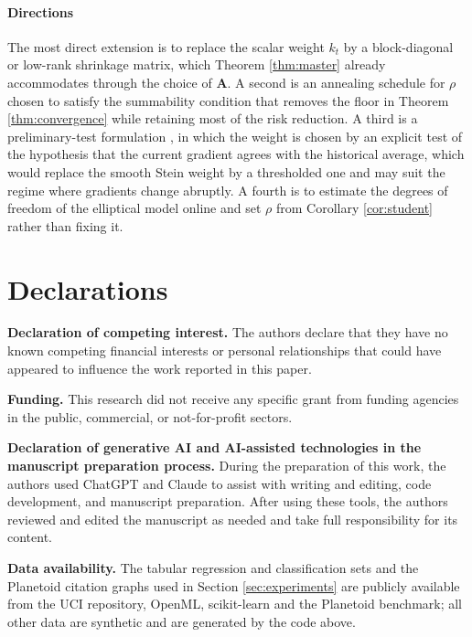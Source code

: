 \documentclass[a4paper,fleqn]{cas-dc}
\theoremstyle{plain}
\theoremstyle{definition}
\theoremstyle{remark}
\begin{document}
\paragraph{Directions}

The most direct extension is to replace the scalar weight $k_t$ by a block-diagonal or low-rank shrinkage matrix, which Theorem \ref{thm:master} already accommodates through the choice of $\bm A$. A second is an annealing schedule for $\rho$ chosen to satisfy the summability condition that removes the floor in Theorem \ref{thm:convergence} while retaining most of the risk reduction. A third is a preliminary-test formulation \citep{saleh2006, judge1978}, in which the weight is chosen by an explicit test of the hypothesis that the current gradient agrees with the historical average, which would replace the smooth Stein weight by a thresholded one and may suit the regime where gradients change abruptly. A fourth is to estimate the degrees of freedom of the elliptical model online and set $\rho$ from Corollary \ref{cor:student} rather than fixing it.




\section*{Declarations}

\textbf{Declaration of competing interest.} The authors declare that they have no known competing financial interests or personal relationships that could have appeared to influence the work reported in this paper.

\textbf{Funding.} This research did not receive any specific grant from funding agencies in the public, commercial, or not-for-profit sectors.

\textbf{Declaration of generative AI and AI-assisted technologies in the manuscript preparation process.}
During the preparation of this work, the authors used ChatGPT and Claude to assist with writing and editing, code development, and manuscript preparation. After using these tools, the authors reviewed and edited the manuscript as needed and take full responsibility for its content.

\textbf{Data availability.} The tabular regression and classification sets and the Planetoid citation graphs used in Section \ref{sec:experiments} are publicly available from the UCI repository, OpenML, scikit-learn and the Planetoid benchmark; all other data are synthetic and are generated by the code above.
\end{document}
